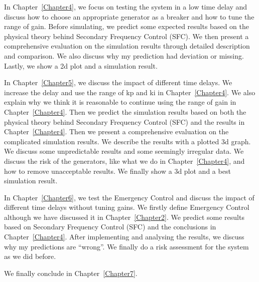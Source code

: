 \begin{description}
    \item In Chapter~\ref{Chapter4}, we focus on testing the system in a low time delay and discuss how to choose an appropriate generator as a breaker and how to tune the range of  gain. Before simulating, we predict some expected results based on the physical theory behind Secondary Frequency Control (SFC). We then present a comprehensive evaluation on the simulation results through detailed description and comparison. We also discuss why my prediction had deviation or missing. Lastly, we show a 2d plot and a simulation result.
    \item In Chapter~\ref{Chapter5}, we discuss the impact of different time delays. We increase the delay and use the range of kp and ki in Chapter~\ref{Chapter4}. We also explain why we think it is reasonable to continue using the range of gain in Chapter~\ref{Chapter4}. Then we predict the simulation results based on both the physical theory behind Secondary Frequency Control (SFC) and the results in Chapter~\ref{Chapter4}. Then we present a comprehensive evaluation on the complicated simulation results. We describe the results with a plotted 3d graph. We discuss some unpredictable results and some seemingly irregular data. We discuss the risk of the generators, like what we do in Chapter~\ref{Chapter4}, and how to remove unacceptable results. We  finally show a 3d plot and a best simulation result. 
    \item In Chapter~\ref{Chapter6}, we test the Emergency Control and discuss the impact of different time delays without tuning gains. We firstly define Emergency Control although we have discussed it in Chapter~\ref{Chapter2}. We predict some results based on Secondary Frequency Control (SFC) and the conclusions in Chapter~\ref{Chapter4}. After implementing and analysing the results, we discuss why my predictions are “wrong”. We finally do a risk assessment for the system as we did before.
\end{description}
We finally conclude in Chapter~\ref{Chapter7}. 